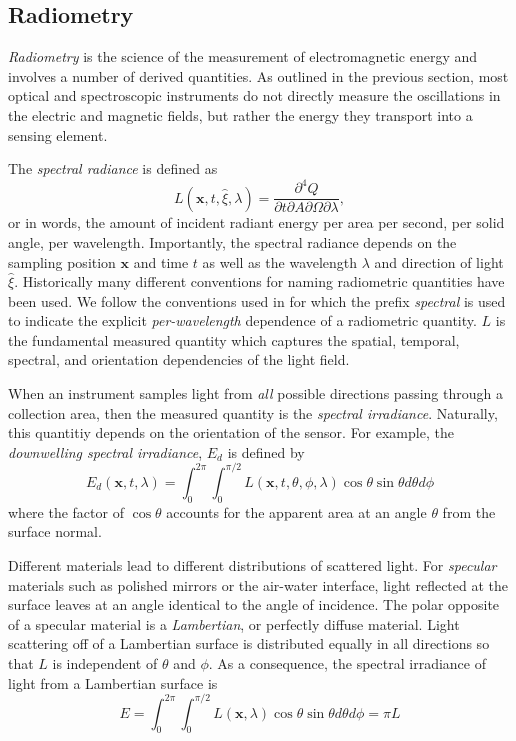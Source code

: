 \subsection{Radiometry}

\textit{Radiometry} is the science of the measurement of electromagnetic energy
and involves a number of derived quantities. As outlined in the previous
section, most optical and spectroscopic instruments do not directly measure the
oscillations in the electric and magnetic fields, but rather the energy they
transport into a sensing element. 

The \textit{spectral radiance} is defined as
\begin{equation}
  L(\mathbf{x}, t, \hat{\xi}, \lambda) = \frac{\partial^4 Q}{\partial t \partial A \partial \Omega \partial \lambda},
\end{equation}
or in words, the amount of incident radiant energy per area per
second, per solid angle, per wavelength. Importantly, the spectral radiance
depends on the sampling position $\mathbf{x}$ and time $t$ as well as the wavelength
$\lambda$ and direction of light $\hat{\xi}$. Historically many different
conventions for naming radiometric quantities have been used. We follow the
conventions used in \cite{mobley-text} for which the prefix \textit{spectral} is
used to indicate the explicit \textit{per-wavelength} dependence of a
radiometric quantity. $L$ is the fundamental measured quantity which captures
the spatial, temporal, spectral, and orientation dependencies of the light field.

When an instrument samples light from \textit{all} possible directions passing
through a collection area, then the
measured quantity is the \textit{spectral irradiance}. Naturally, this quantitiy
depends on the orientation of the sensor. For example, the \textit{downwelling
  spectral irradiance}, $E_d$ is defined by
\begin{equation}
  E_d(\mathbf{x}, t, \lambda) = \int_0^{2\pi} \int_0^{\pi/2}L(\mathbf{x}, t, \theta, \phi, \lambda)\cos\theta \sin\theta d\theta d\phi
\end{equation}
where the factor of $\cos\theta$ accounts for the apparent area at an angle
$\theta$ from the surface normal.

Different materials lead to different distributions of scattered light. For
\textit{specular} materials such as polished mirrors or the air-water interface, light
reflected at the surface leaves at an angle identical to the angle of incidence.
The polar opposite of a specular material is a \textit{Lambertian}, or perfectly
diffuse material. Light scattering off of a Lambertian surface is distributed
equally in all directions so that $L$ is independent of $\theta$ and $\phi$. As
a consequence, the spectral irradiance of light from a Lambertian surface is
\begin{equation}
  E = \int_0^{2\pi}\int_0^{\pi/2} L(\mathbf{x}, \lambda)\cos\theta \sin\theta d\theta d\phi = \pi L
\end{equation}

